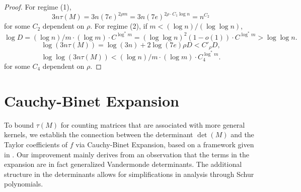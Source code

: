 \documentclass[10pt,a4paper]{article}
\theoremstyle{remark}
\numberwithin{equation}{section}
\numberwithin{theorem}{section}
\begin{document}
\begin{proof}
For regime (1), 
\[3n\tau(M) = 3n(7e)^{2\rho m} = 3n(7e)^{2\rho \cdot C_1\log n} = n^{C_2}\]
for some $C_2$ dependent on $\rho$. For regime (2), if $m < (\log n)/(\log \log n)$,
\[\log D = (\log n)/m \cdot (\log m) \cdot C^{\log^* m}
= (\log\log n)^2(1 - o(1)) \cdot C^{\log^* m} > \log \log n.\]
\[\log(3n\tau(M)) = \log(3n) + 2\log(7e)\rho D < C'_\rho D,\]
\[\log\log(3n\tau(M)) < (\log n)/m \cdot (\log m) \cdot C_4^{\log^* m}.\]
for some $C_4$ dependent on $\rho$.
\end{proof}

\section{Cauchy-Binet Expansion} \label{sec:cauchybinet}
To bound $\tau(M)$ for counting matrices that are associated with more general kernels, we establish the connection between the determinant $\det(M)$ and the Taylor coefficients of $f$ via Cauchy-Binet Expansion, based on a framework given in \cite{ACSS20}. Our improvement mainly derives from an observation that the terms in the expansion are in fact generalized Vandermonde determinants. The additional structure in the determinants allows for simplifications in analysis through Schur polynomials.
\end{document}
